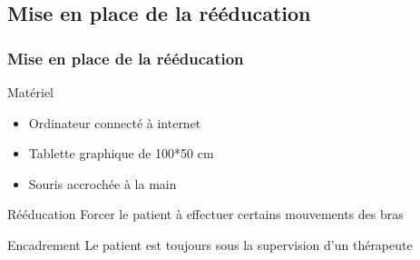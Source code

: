 \documentclass{beamer}
\begin{document}
\subsection{Mise en place de la rééducation}
\begin{frame}
\frametitle{Mise en place de la rééducation}

\begin{block}{Matériel}

\begin{itemize}
\item Ordinateur connecté à internet
\item Tablette graphique de 100*50 cm
\item Souris accrochée à la main
\end{itemize}

\end{block}

\pause
\begin{block}{Rééducation}
Forcer le patient à effectuer certains mouvements des bras
\end{block}

\pause
\begin{block}{Encadrement}
Le patient est toujours sous la supervision d'un thérapeute
\end{block}

\end{frame}
\end{document}
